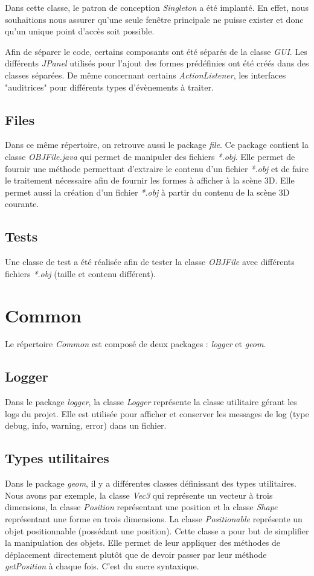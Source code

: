 \documentclass[11pt]{report}
\begin{document}
Dans cette classe, le patron de conception \textit{Singleton} a été implanté. En effet, nous souhaitions nous assurer qu'une seule fenêtre principale ne puisse exister et donc qu'un unique point d'accès soit possible.

Afin de séparer le code, certains composants ont été séparés de la classe \textit{GUI}. Les différents \textit{JPanel} utilisés pour l'ajout des formes prédéfinies ont été créés dans des classes séparées. De même concernant certains \textit{ActionListener}, les interfaces "auditrices" pour différents types d'évènements à traiter.


\subsection{Files}
Dans ce même répertoire, on retrouve aussi le package \textit{file}. Ce package contient la classe \textit{OBJFile.java} qui permet de manipuler des fichiers \textit{*.obj}. Elle permet de fournir une méthode permettant d'extraire le contenu d'un fichier \textit{*.obj} et de faire le traitement nécessaire afin de fournir les formes à afficher à la scène 3D.
Elle permet aussi la création d'un fichier \textit{*.obj} à partir du contenu de la scène 3D courante.

\subsection{Tests}

Une classe de test a été réalisée afin de tester la classe \textit{OBJFile} avec différents fichiers \textit{*.obj} (taille et contenu différent).

\section{Common}
Le répertoire \textit{Common} est composé de deux packages : \textit{logger} et \textit{geom}.

\subsection{Logger}
Dans le package \textit{logger}, la classe \textit{Logger} représente la classe utilitaire gérant les logs du projet. Elle est utilisée pour afficher et conserver les messages de log (type debug, info, warning, error) dans un fichier.

\subsection{Types utilitaires}
Dans le package \textit{geom}, il y a différentes classes définissant des types utilitaires. Nous avons par exemple, la classe \textit{Vec3} qui représente un vecteur à trois dimensions, la classe \textit{Position} représentant une position et la classe \textit{Shape} représentant une forme en trois dimensions. La classe \textit{Positionable} représente un objet positionnable (possédant une position). Cette classe a pour but de simplifier la manipulation des objets. Elle permet de leur appliquer des méthodes de déplacement directement plutôt que de devoir passer par leur méthode \textit{getPosition} à chaque fois. C'est du sucre syntaxique.
\end{document}
